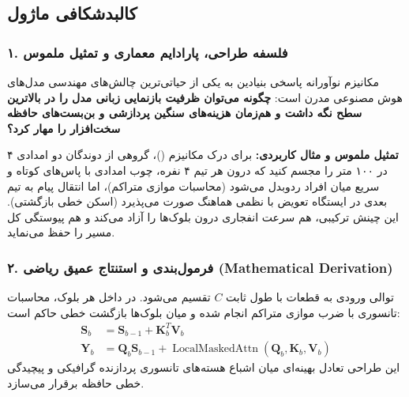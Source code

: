 \subsection{کالبدشکافی ماژول }

\subsubsection*{۱. فلسفه طراحی، پارادایم معماری و تمثیل ملموس}
مکانیزم نوآورانه  پاسخی بنیادین به یکی از حیاتی‌ترین چالش‌های مهندسی مدل‌های هوش مصنوعی مدرن است: \textbf{چگونه می‌توان ظرفیت بازنمایی زبانی مدل را در بالاترین سطح نگه داشت و هم‌زمان هزینه‌های سنگین پردازشی و بن‌بست‌های حافظه سخت‌افزار را مهار کرد؟}

\textbf{تمثیل ملموس و مثال کاربردی:}
برای درک مکانیزم  ()، گروهی از دوندگان دو امدادی ۴ در ۱۰۰ متر را مجسم کنید که درون هر تیم ۴ نفره، چوب امدادی با پاس‌های کوتاه و سریع میان افراد ردوبدل می‌شود (محاسبات موازی متراکم)، اما انتقال پیام به تیم بعدی در ایستگاه تعویض با نظمی هماهنگ صورت می‌پذیرد (اسکن خطی بازگشتی). این چینش ترکیبی، هم سرعت انفجاری درون بلوک‌ها را آزاد می‌کند و هم پیوستگی کل مسیر را حفظ می‌نماید.

\subsubsection*{۲. فرمول‌بندی و استنتاج عمیق ریاضی (Mathematical Derivation)}
توالی ورودی به قطعات با طول ثابت $C$ تقسیم می‌شود. در داخل هر بلوک، محاسبات تانسوری با ضرب موازی متراکم انجام شده و میان بلوک‌ها بازگشت خطی حاکم است:
\begin{align}
\mathbf{S}_b &= \mathbf{S}_{b-1} + \mathbf{K}_b^T \mathbf{V}_b \\
\mathbf{Y}_b &= \mathbf{Q}_b \mathbf{S}_{b-1} + \operatorname{LocalMaskedAttn}(\mathbf{Q}_b, \mathbf{K}_b, \mathbf{V}_b)
\end{align}
این طراحی تعادل بهینه‌ای میان اشباع هسته‌های تانسوری پردازنده گرافیکی و پیچیدگی خطی حافظه برقرار می‌سازد.

